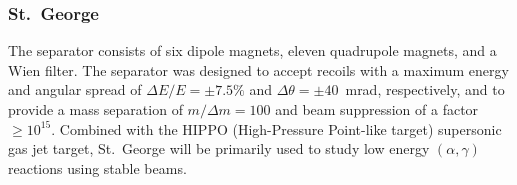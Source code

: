 \subsubsection{St.\ George}
The separator consists of six dipole magnets, eleven quadrupole magnets, and a
Wien filter. The separator was designed to accept recoils with a maximum
energy and angular spread of $\Delta E/E = \pm7.5\%$ and
$\Delta\theta = \pm40$~mrad, respectively, and to provide a mass separation
of $m/\Delta m = 100$ and beam suppression of a factor $\geq 10^{15}$. Combined
with the HIPPO (High-Pressure Point-like target) supersonic gas jet target,
St.\ George will be primarily used to study low energy $(\alpha,\gamma)$
reactions using stable beams.


